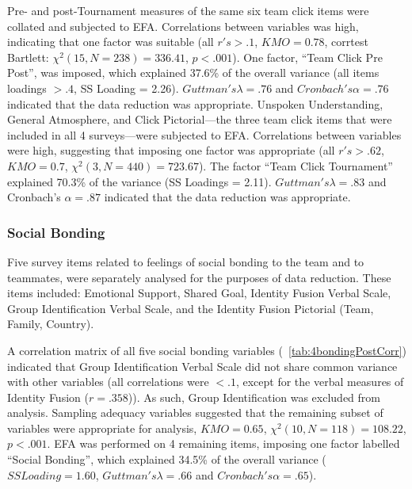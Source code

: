 Pre- and post-Tournament measures of the same six team click items were collated and subjected to EFA. Correlations between variables was high, indicating that one factor was suitable (all $r's > .1$, $KMO = 0.78$, corrtest Bartlett: $\chi^2(15, N = 238) = 336.41$, $p < .001$).  One factor, ``Team Click Pre Post'', was imposed, which explained 37.6\% of the overall variance (all items loadings $> .4$, SS Loading = 2.26).  $Guttman's \lambda =.76$ and $Cronbach's \alpha = .76$ indicated that the data reduction was appropriate.
Unspoken Understanding, General Atmosphere, and Click Pictorial---the three team click items that were included in all 4 surveys---were subjected to EFA.  Correlations between variables were high, suggesting that imposing one factor was appropriate (all $r's > .62$, $KMO = 0.7$, $\chi^2(3, N = 440) = 723.67$).  The factor ``Team Click Tournament'' explained 70.3\% of the variance (SS Loadings = 2.11).  $Guttman's \lambda =.83$ and Cronbach's $\alpha = .87$ indicated that the data reduction was appropriate.




\subsubsection{Social Bonding}
Five survey items related to feelings of social bonding to the team and to teammates, were separately analysed for the purposes of data reduction.  These items included: Emotional Support, Shared Goal, Identity Fusion Verbal Scale, Group Identification Verbal Scale, and the Identity Fusion Pictorial (Team, Family, Country).

A correlation matrix of all five social bonding variables (~\ref{tab:4bondingPostCorr}) indicated that Group Identification Verbal Scale did not share common variance with other variables (all correlations were $<.1$, except for the verbal measures of Identity Fusion ($r =.358$)). As such, Group Identification was excluded from analysis.  Sampling adequacy variables suggested that the remaining subset of variables were appropriate for analysis, $KMO = 0.65$, $\chi^2(10, N = 118) = 108.22$, $p < .001$.  EFA was performed on 4 remaining items, imposing one factor labelled ``Social Bonding'', which explained 34.5\% of the overall variance ($SS Loading = 1.60$, $Guttman's \lambda =.66$ and $Cronbach's \alpha = .65$).

